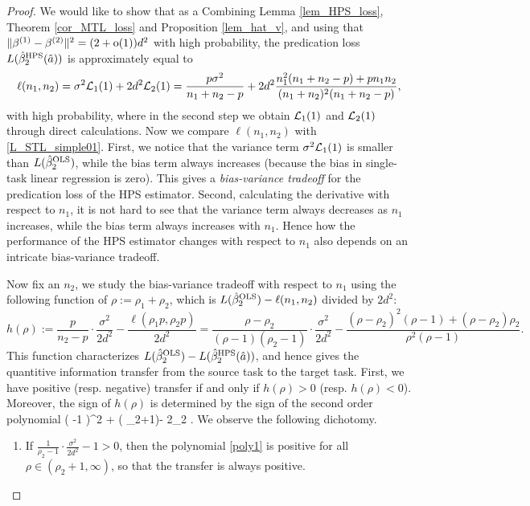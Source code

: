 \begin{proof}
We would like to show that as a 
Combining Lemma \ref{lem_HPS_loss}, Theorem \ref{cor_MTL_loss} and Proposition \ref{lem_hat_v}, and using  that $\|\beta^{(1)}-\beta^{(2)}\|^2 = (2+\oo(1))d^2$ with high probability, the predication loss $L(\hat{\beta}_2^{\MTL}(\hat a)) $ is approximately equal to
$$\ell(n_1,n_2)= \sigma^2 \cal L_1(1) +   2d^2 \cal L_2(1)= \frac{p\sigma^2}{n_1+n_2-p} +  2d^2  \frac{n_1^2 (n_1+n_2-p)+p n_1n_2}{(n_1+n_2)^2(n_1+n_2-p)}, $$
with high probability, where in the second step we obtain $\cal L_1(1)$ and $\cal L_2(1)$ through direct calculations.
Now we compare $\ell(n_1,n_2)$ with \eqref{L_STL_simple01}. First, we notice that the variance term $\sigma^2 \cal L_1(1)$ is smaller than $L(\hat{\beta}_2^{\STL} )$, while the bias term always increases (because the bias in single-task linear regression is zero). This gives a \emph{bias-variance tradeoff} for the predication loss of the HPS estimator. Second, calculating the derivative with respect to $n_1$, it is not hard to see that the variance term always decreases as $n_1$ increases, while the bias term always increases with $n_1$. Hence how the performance of the HPS estimator changes with respect to $n_1$ also depends on an intricate bias-variance tradeoff.

Now fix an $n_2$, we study the bias-variance tradeoff with respect to $n_1$ using the following function of $\rho:=\rho_1+\rho_2$, which is $L(\hat{\beta}_2^{\STL} )-\ell(n_1,n_2)$ divided by $2d^2$:
$$h(\rho):=\frac{p }{n_2-p}\cdot \frac{\sigma^2}{2d^2}- \frac{\ell(\rho_1p , \rho_2p)}{2d^2}  = \frac{\rho-\rho_2}{(\rho-1)(\rho_2-1)}\cdot \frac{\sigma^2}{2d^2}- \frac{(\rho-\rho_2)^2 (\rho-1)+(\rho-\rho_2)\rho_2}{\rho^2(\rho-1)}  .$$
This function characterizes $L(\hat{\beta}_2^{\STL} )-L(\hat{\beta}_2^{\MTL}(\hat a)) $, and hence gives the quantitive information transfer from the source task to the target task.
First, we have positive (resp. negative) transfer if and only if $h(\rho)>0$ (resp. $h(\rho)<0$). Moreover, the sign of $h(\rho)$ is determined by the sign of the second order polynomial %
\be\label{poly1} \left( \cdot {}-1 \right)\rho^2 + ( \rho_2+1)\rho - 2\rho_2 .\ee
We observe the following dichotomy. %
\begin{enumerate}
\item If $\frac{1}{\rho_2-1}\cdot \frac{\sigma^2}{2d^2}-1 >0$, then the polynomial \eqref{poly1} is positive for all $\rho\in (\rho_2+1,\infty)$, so that the transfer is always positive.


\end{enumerate}
\end{proof}
